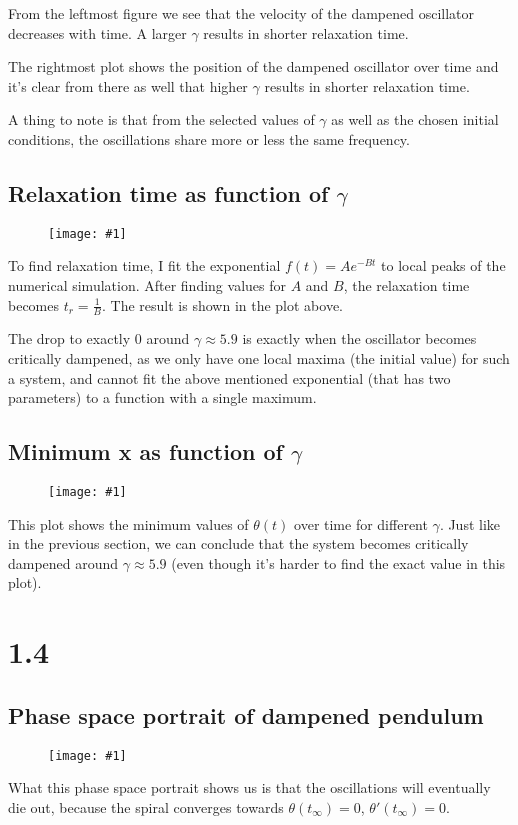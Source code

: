 \documentclass[11pt]{article}
\newcommand{\singlefigure}[1]{
\begin{figure}[H]
  \centering
  \begin{minipage}{0.4\textwidth}
    \centering
    \texttt{[image: \#1]}
  \end{minipage}
\end{figure}
}
\begin{document}
From the leftmost figure we see that the velocity of the dampened oscillator decreases with time. A larger $\gamma$ results in shorter relaxation time.

The rightmost plot shows the position of the dampened oscillator over time and it's clear from there as well that higher $\gamma$ results in shorter relaxation time.

A thing to note is that from the selected values of $\gamma$ as well as the chosen initial conditions, the oscillations share more or less the same frequency.

\pagebreak
\begin{multicols}{2}
\subsection*{Relaxation time as function of $\gamma$}
\singlefigure{./plots/1_3/study.png}
To find relaxation time, I fit the exponential $f(t) = A e^{-Bt}$ to local peaks of the numerical simulation.
After finding values for $A$ and $B$, the relaxation time becomes $t_r = \frac{1}{B}$. The result is shown in the plot above.

The drop to exactly 0 around $\gamma\approx 5.9$ is exactly when the oscillator becomes critically dampened, as we only have one local maxima (the initial value) for such a system, and cannot fit the above mentioned exponential (that has two parameters) to a function with a single maximum. 
\columnbreak
\subsection*{Minimum x as function of $\gamma$}
\singlefigure{./plots/1_3/study_2.png}
This plot shows the minimum values of $\theta (t)$ over time for different $\gamma$. Just like in the previous section, we can conclude that the system becomes critically dampened around $\gamma \approx 5.9$ (even though it's harder to find the exact value in this plot).
\end{multicols}

\section*{1.4}
\subsection*{Phase space portrait of dampened pendulum}
\singlefigure{./plots/1_4/study.png}
What this phase space portrait shows us is that the oscillations will eventually die out, because the spiral converges towards $\theta(t_\infty) = 0$, $\theta'(t_\infty) = 0$.
\end{document}

